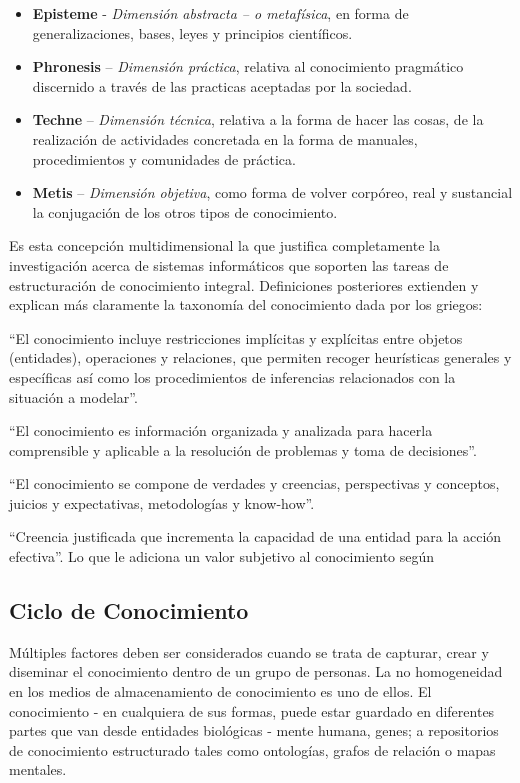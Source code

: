 \begin{itemize}
\item  \textbf{Episteme} -\textit{ Dimensión abstracta – o metafísica}, en forma de generalizaciones, bases, leyes y principios científicos.

\item \textbf{Phronesis }– \textit{Dimensión práctica}, relativa al conocimiento pragmático discernido a través de las practicas aceptadas por la sociedad.

\item \textbf{Techne} – \textit{Dimensión técnica}, relativa a la forma de hacer las cosas, de la realización de actividades concretada en la forma de manuales, procedimientos y comunidades de práctica.

\item \textbf{Metis} – \textit{Dimensión objetiva}, como forma de volver corpóreo, real y sustancial la conjugación de los otros tipos de conocimiento.
\end{itemize}

Es esta concepción multidimensional la que justifica completamente la investigación acerca de sistemas informáticos que soporten las tareas de estructuración de conocimiento integral. Definiciones posteriores extienden y explican más claramente la taxonomía del conocimiento dada por los griegos:

“El conocimiento incluye restricciones implícitas y explícitas entre objetos (entidades), operaciones y relaciones, que permiten recoger heurísticas generales y específicas así como los procedimientos de inferencias relacionados con la situación a modelar”.\cite{sowa1984}

“El conocimiento es información organizada y analizada para hacerla comprensible y aplicable a la resolución de problemas y toma de decisiones”.\cite{turban1992}

“El conocimiento se compone de verdades y creencias, perspectivas y conceptos, juicios y expectativas, metodologías y know-how”.\cite{wiig1993}

“Creencia justificada que incrementa la capacidad de una entidad para la acción efectiva”. Lo que le adiciona un valor subjetivo al conocimiento según \cite{nokata1994}

\subsection{Ciclo de Conocimiento}

Múltiples factores deben ser considerados cuando se trata de capturar, crear y diseminar el conocimiento dentro de un grupo de personas. La no homogeneidad en los medios de almacenamiento de conocimiento es uno de ellos. El conocimiento - en cualquiera de sus formas, puede estar guardado en diferentes partes que van desde entidades biológicas - mente humana, genes; a repositorios de conocimiento estructurado tales como ontologías, grafos de relación o mapas mentales.

